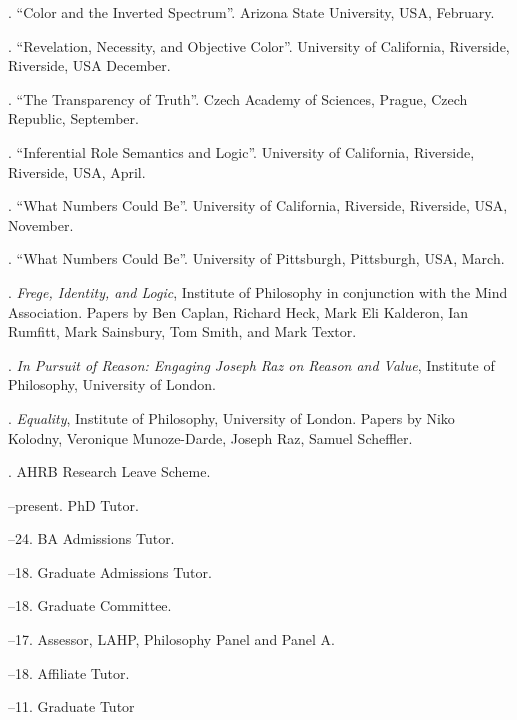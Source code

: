 \documentclass[11pt]{article}
\begin{document}
. ``Color and the Inverted Spectrum''. Arizona State University, USA, February.

. ``Revelation, Necessity, and Objective Color''. University of California, Riverside, Riverside, USA December.

. ``The Transparency of Truth''. Czech Academy of Sciences, Prague, Czech Republic, September.

. ``Inferential Role Semantics and Logic''. University of California, Riverside, Riverside, USA, April.

. ``What Numbers Could Be''. University of California, Riverside, Riverside, USA, November.

. ``What Numbers Could Be''. University of Pittsburgh, Pittsburgh, USA, March.



\bigskip

\medskip

. \emph{Frege, Identity, and Logic}, Institute of Philosophy in conjunction with the Mind Association. Papers by Ben Caplan, Richard Heck, Mark Eli Kalderon, Ian Rumfitt, Mark Sainsbury, Tom Smith, and Mark Textor.

. \emph{In Pursuit of Reason: Engaging Joseph Raz on Reason and Value}, Institute of Philosophy, University of London.

. \emph{Equality}, Institute of Philosophy, University of London. Papers by Niko Kolodny, Veronique Munoze-Darde, Joseph Raz, Samuel Scheffler.

\bigskip

\medskip
  
. AHRB Research Leave Scheme.

\bigskip 

\medskip

--present. PhD Tutor.

--24. BA Admissions Tutor.

--18. Graduate Admissions Tutor.

--18. Graduate Committee.

--17. Assessor, LAHP, Philosophy Panel and Panel A.

--18. Affiliate Tutor.

--11. Graduate Tutor
\end{document}

